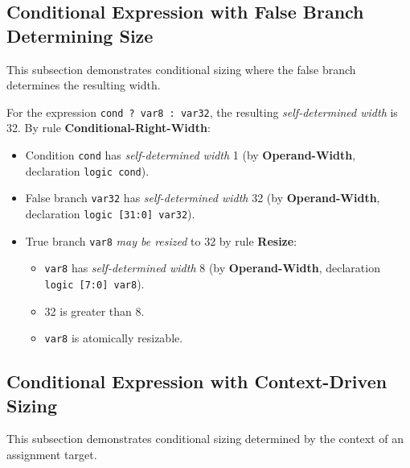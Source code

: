 \documentclass{article}
\newcommand{\sv}[1]{\texttt{#1}}
\newcommand{\sds}{\emph{self-determined width}}
\newcommand{\mbr}{\emph{may be resized}}
\begin{document}
\subsection{Conditional Expression with False Branch Determining Size}

This subsection demonstrates conditional sizing where the false
branch determines the resulting width.

For the expression \sv{cond ? var8 : var32}, the resulting \sds{} is
32. By rule \textbf{Conditional-Right-Width}:
\begin{itemize}
  \item Condition \sv{cond} has \sds{} 1 (by
    \textbf{Operand-Width}, declaration \sv{logic cond}).
  \item False branch \sv{var32} has \sds{} 32 (by
    \textbf{Operand-Width}, declaration \sv{logic [31:0] var32}).
  \item True branch \sv{var8} \mbr{} to 32 by rule \textbf{Resize}:
    \begin{itemize}
      \item \sv{var8} has \sds{} 8 (by
        \textbf{Operand-Width}, declaration \sv{logic [7:0] var8}).
      \item 32 is greater than 8.
      \item \sv{var8} is atomically resizable.
    \end{itemize}
\end{itemize}

\subsection{Conditional Expression with Context-Driven Sizing}

This subsection demonstrates conditional sizing determined by the
context of an assignment target.
\end{document}
